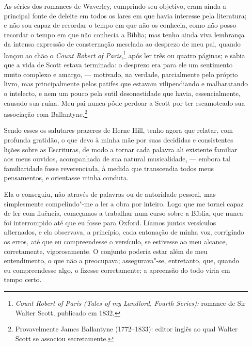 As séries dos romances de Waverley, cumprindo seu objetivo, eram
ainda a principal fonte de deleite em todos os lares em que havia
interesse pela literatura; e não sou capaz de recordar o tempo em que
não os conhecia, como não posso recordar o tempo em que não conhecia a
Bíblia; mas tenho ainda viva lembrança da intensa expressão de
consternação mesclada ao desprezo de meu pai, quando lançou ao chão o
\textit{Count Robert of Paris},\footnote{\textit{Count Robert of Paris (Tales
  of my Landlord, Fourth Series):} romance de Sir Walter Scott,
  publicado em 1832.} após ler três ou quatro
páginas; e sabia que a vida de Scott estava terminada: o desprezo era
para ele um sentimento muito complexo e amargo, --- motivado, na verdade,
parcialmente pelo próprio livro, mas principalmente pelos patifes que
estavam vilipendiando e malbaratando o intelecto, e nem um pouco pela
sutil desonestidade que havia, essencialmente, causado sua ruína. Meu
pai nunca pôde perdoar a Scott por ter escamoteado sua associação com
Ballantyne.\footnote{Provavelmente James Ballantyne (1772--1833): editor
  inglês ao qual Walter Scott se associou secretamente.}

Sendo esses os salutares prazeres de Herne Hill, tenho agora que
relatar, com profunda gratidão, o que devo à minha mãe por suas
decididas e consistentes lições sobre as Escrituras, de modo a tornar
cada palavra ali existente familiar aos meus ouvidos, acompanhada de sua
natural musicalidade, --- embora tal familiaridade fosse reverenciada, à
medida que transcendia todos meus pensamentos, e orientasse minha
conduta.

Ela o conseguiu, não através de palavras ou de autoridade pessoal, mas
simplesmente compelindo"-me a ler a obra por inteiro. Logo que me tornei
capaz de ler com fluência, começamos a trabalhar num curso sobre a
Bíblia, que nunca foi interrompido até que eu fosse para Oxford. Líamos
juntos versículos alternados, e ela observava, a princípio, cada
entonação de minha voz, corrigindo os erros, até que eu compreendesse o
versículo, se estivesse ao meu alcance, corretamente, vigorosamente. O
conjunto poderia estar além de meu entendimento, o que não a preocupava;
assegurava"-se, entretanto, que, quando eu compreendesse algo, o fizesse
corretamente; a apreensão do todo viria em tempo certo.

